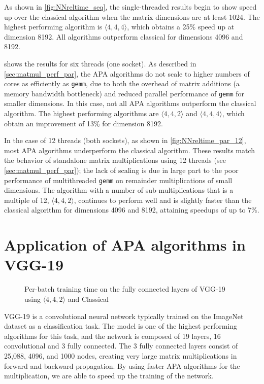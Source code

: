 \documentclass[sigconf,review,anonymous]{acmart}
\newcommand{\dims}[1]{\langle #1 \rangle}
\begin{document}
As shown in \cref{fig:NNreltime_seq}, the single-threaded results begin to show speed up over the classical algorithm when the matrix dimensions are at least 1024.
The highest performing algorithm is $\dims{4,4,4}$, which obtains a 25\% speed up at dimension 8192. 
All algorithms outperform classical for dimensions 4096 and 8192.

 shows the results for six threads (one socket).
As described in \cref{sec:matmul_perf_par}, the APA algorithms do not scale to higher numbers of cores as efficiently as \texttt{gemm}, due to both the overhead of matrix additions (a memory bandwidth bottleneck) and reduced parallel performance of \texttt{gemm} for smaller dimensions.
In this case, not all APA algorithms outperform the classical algorithm.
The highest performing algorithms are $\dims{4,4,2}$ and $\dims{4,4,4}$, which obtain an improvement of 13\% for dimension 8192.

In the case of 12 threads (both sockets), as shown in \cref{fig:NNreltime_par_12}, most APA algorithms underperform the classical algorithm.
These results match the behavior of standalone matrix multiplications using 12 threads (see \cref{sec:matmul_perf_par}); the lack of scaling is due in large part to the poor performance of multithreaded \texttt{gemm} on remainder multiplications of small dimensions.
The algorithm with a number of sub-multiplications that is a multiple of 12, $\dims{4,4,2}$, continues to perform well and is slightly faster than the classical algorithm for dimensions 4096 and 8192, attaining speedups of up to 7\%.

\section{Application of APA algorithms in VGG-19}

\begin{figure}
%
%
\hfill	
{}
%
\caption{Per-batch training time on the fully connected layers of VGG-19 using $\dims{4,4,2}$ and Classical}
\label{fig:vgg}
\end{figure}


VGG-19 \cite{SZ15} is a convolutional neural network typically trained on the ImageNet dataset as a classification task. 
The model is one of the highest performing algorithms for this task, and the network is composed of 19 layers, 16 convolutional and 3 fully connected. 
The 3 fully connected layers consist of 25{,}088, 4096, and 1000 nodes, creating very large matrix multiplications in forward and backward propagation. 
By using faster APA algorithms for the multiplication, we are able to speed up the training of the network. 
\end{document}

